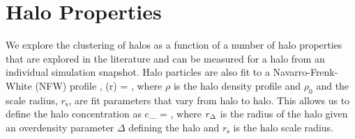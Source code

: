 \documentclass[usenatbib,usegraphicx,letterpaper]{mn2e}
\begin{document}

\section{Halo Properties}
\label{section:haloprops}

We explore the clustering of halos as a function of a number of halo properties that are explored in the 
literature and can be measured for a halo from an individual simulation snapshot. Halo particles are also fit to a Navarro-Frenk-White (NFW) profile \citep{nfw97},
\beq
\rho(r) = ,
\eeq
where $\rho$ is the halo density profile and $\rho_0$ and the scale radius, $r_{\mathrm{s}}$, are fit parameters that vary from halo to halo. This allows us to define the halo concentration as
\beq
c_{} = ,
\eeq
where $r_{\Delta}$ is the radius of the halo given an overdensity parameter $\Delta$ defining the halo and 
$r_{\mathrm{s}}$ is the halo scale radius. 
\end{document}
